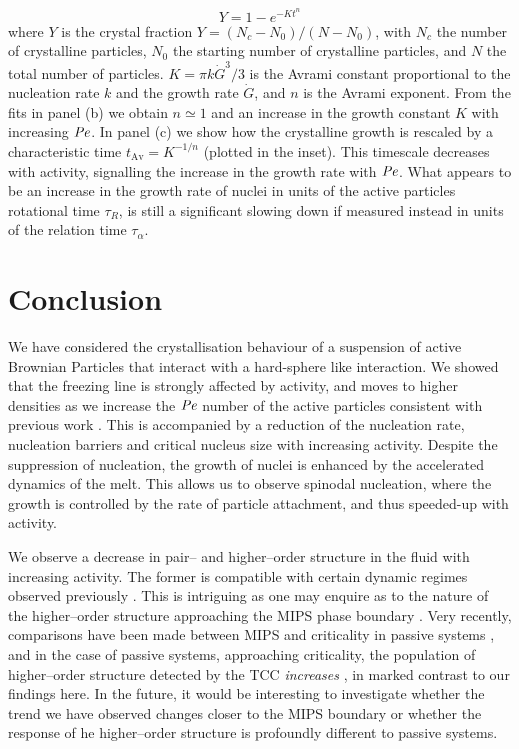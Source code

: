\begin{equation}
Y=1-e^{-K t^n}
\end{equation}
where $Y$ is the crystal fraction $Y=(N_c-N_0)/(N-N_0)$, with $N_c$ the number of crystalline particles, $N_0$ the starting number of crystalline particles, and $N$ the total number of particles. $K=\pi k\dot{G}^3/3$ is the Avrami constant proportional to the nucleation rate $k$ and the growth rate $\dot{G}$, and $n$ is the Avrami exponent. From the fits in panel (b) we obtain $n\simeq 1$ and an increase in the growth constant $K$ with increasing $\operatorname{\mathit{P\kern-.08em e}}$. In panel (c) we show how the crystalline growth is rescaled by a characteristic time $t_\text{Av}=K^{-1/n}$ (plotted in the inset). This timescale decreases with activity, signalling the increase in the growth rate with $\operatorname{\mathit{P\kern-.08em e}}$. What appears to be an increase in the growth rate of nuclei in units of the active particles rotational time $\tau_R$, is still a significant slowing down if measured instead in units of the relation time $\tau_\alpha$.


\label{sectionCrystalGrowthActivity}






\section{Conclusion}
\label{sectionConclusion}


We have considered the crystallisation behaviour of a suspension of active Brownian Particles that interact with a hard-sphere like interaction. We showed that the freezing line is strongly affected by activity, and moves to higher densities as we increase the $\operatorname{\mathit{P\kern-.08em e}}$ number of the active particles consistent with previous work \cite{wysocki2014,stenhammar2014}. This is accompanied by a reduction of the nucleation rate, nucleation barriers and critical nucleus size with increasing activity. Despite the suppression of nucleation, the growth of nuclei is enhanced by the accelerated dynamics of the melt. This allows us to observe spinodal nucleation, where the growth is controlled by the rate of particle attachment, and thus speeded-up with activity. 


We observe a decrease in pair-- and higher--order structure in the fluid with increasing activity. The former is compatible with certain dynamic regimes observed previously \cite{janssen2019,szamel2015,berthier2017}. This is intriguing as one may enquire as to the nature of the higher--order structure approaching the MIPS phase boundary \cite{omar2021a,turci2021}. Very recently, comparisons have been made between MIPS and criticality in passive systems \cite{turci2021}, and in the case of passive systems, approaching criticality, the population of higher--order structure detected by the TCC \emph{increases}  \cite{richard2018}, in marked contrast to our findings here. In the future, it would be interesting to investigate whether the trend we have observed changes closer to the MIPS boundary or whether the response of he higher--order structure is profoundly different to passive systems.


